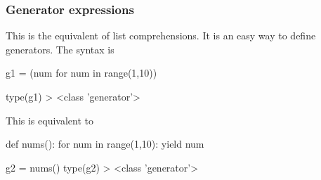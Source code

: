 \subsubsection{Generator expressions}

This is the equivalent of list comprehensions. It is an easy way to define generators. The syntax is 
\begin{listing}{1}
g1 = (num for num in range(1,10)) 

type(g1)
> <class 'generator'>
\end{listing}
This is equivalent to 
\begin{listingcont}
def nums():
    for num in range(1,10):
        yield num 

g2 = nums()
type(g2)
> <class 'generator'>
\end{listingcont}